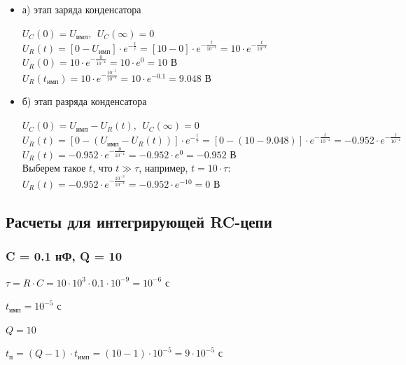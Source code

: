 \documentclass[a4paper,14pt]{extarticle}
\begin{document}
\begin{itemize}
	\item[] а) этап заряда конденсатора

	$U_C(0)	= U_\text{имп},\ \ U_C(\infty) = 0$\\		
	$U_R(t) = [0 - U_\text{имп}] \cdot e^{-\frac{t}{\tau}} = [10 - 0] \cdot e^{-\frac{t}{10^{-4}}} = 10 \cdot e^{-\frac{t}{10^{-4}}}$\\
	$U_R(0) = 10 \cdot e^{-\frac{0}{10^{-4}}} = 10 \cdot e^0 = 10 \text{ В}$\\
	$U_R(t_\text{имп}) = 10 \cdot e^{-\frac{10^{-5}}{10^{-4}}} = 10 \cdot e^{-0.1} = 9.048 \text{ В}$

	\item[] б) этап разряда конденсатора
	
	$U_C(0)	= U_\text{имп} - U_R(t),\ \ U_C(\infty) = 0$\\
	$U_R(t) = [0 - (U_\text{имп} - U_R(t))] \cdot e^{-\frac{t}{\tau}} = [0 - (10 - 9.048)] \cdot e^{-\frac{t}{10^{-4}}} = -0.952 \cdot e^{-\frac{t}{10^{-4}}}$\\
	$U_R(t) = -0.952 \cdot e^{-\frac{0}{10^{-4}}} = -0.952 \cdot e^0 = -0.952 \text{ В}$\\
	Выберем такое $t$, что $t \gg \tau$, например, $t = 10 \cdot \tau$:\\
	$U_R(t) = -0.952 \cdot e^{-\frac{10^{-3}}{10^{-4}}} = -0.952 \cdot e^{-10} = 0 \text{ В}$
\end{itemize}

\newpage

\subsection{Расчеты для интегрирующей RC-цепи}

\subsubsection{C = 0.1 нФ, Q = 10}

$\tau = R \cdot C = 10 \cdot 10^3 \cdot 0.1 \cdot 10^{-9} = 10^{-6} \text{ с}$
		
$t_\text{имп} = 10^{-5} \text{ с}$
		
$Q = 10$		
		
$t_\text{п} = (Q - 1) \cdot t_\text{имп} = (10 - 1) \cdot 10^{-5} = 9 \cdot 10^{-5} \text{ с}$
		
\end{document}
